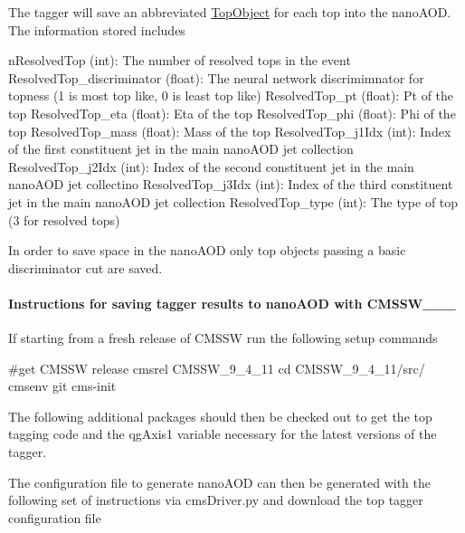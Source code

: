 The tagger will save an abbreviated \hyperlink{classTopObject}{Top\-Object} for each top into the nano\-A\-O\-D. The information stored includes


\begin{DoxyCode}
nResolvedTop (\textcolor{keywordtype}{int}): The number of resolved tops in the event
ResolvedTop\_discriminator (float): The neural network discrimimnator for topness (1 is most top like, 0 is 
      least top like)
ResolvedTop\_pt (float): Pt of the top
ResolvedTop\_eta (float): Eta of the top
ResolvedTop\_phi (float): Phi of the top
ResolvedTop\_mass (float): Mass of the top
ResolvedTop\_j1Idx (int): Index of the first constituent jet in the main nanoAOD jet collection
ResolvedTop\_j2Idx (int): Index of the second constituent jet in the main nanoAOD jet collectino
ResolvedTop\_j3Idx (int): Index of the third constituent jet in the main nanoAOD jet collection
ResolvedTop\_type (int): The type of top (3 for resolved tops)
\end{DoxyCode}


In order to save space in the nano\-A\-O\-D only top objects passing a basic discriminator cut are saved.

\paragraph*{Instructions for saving tagger results to nano\-A\-O\-D with C\-M\-S\-S\-W\-\_\-\_\-\_}

If starting from a fresh release of C\-M\-S\-S\-W run the following setup commands


\begin{DoxyCode}
\textcolor{preprocessor}{#get CMSSW release}
\textcolor{preprocessor}{}cmsrel CMSSW\_9\_4\_11
cd CMSSW\_9\_4\_11/src/
cmsenv
git cms-init
\end{DoxyCode}


The following additional packages should then be checked out to get the top tagging code and the qg\-Axis1 variable necessary for the latest versions of the tagger.




The configuration file to generate nano\-A\-O\-D can then be generated with the following set of instructions via cms\-Driver.\-py and download the top tagger configuration file


